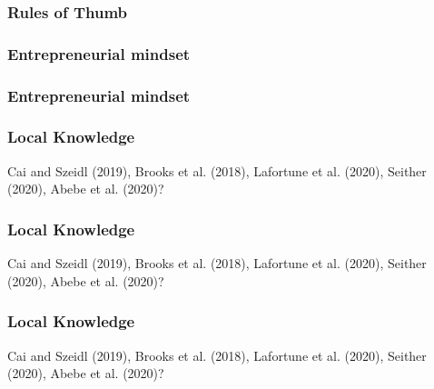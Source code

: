 \documentclass[hideothersubsections, usenames,dvipsnames,11pt]{beamer}
\newenvironment{itemize_2pt}{\itemize\addtolength{\itemsep}{2pt}}{\enditemize}
\begin{document}
\begin{frame}
\frametitle{Rules of Thumb}
	\begin{itemize_2pt}
	\item \citep{Arraiz2019} \citep{Cole2019}
	\vspace{0.1in}
	\end{itemize_2pt}
\end{frame}

%

\begin{frame}
\frametitle{Entrepreneurial mindset}
	\begin{itemize_2pt}
	\item \citep{Campos2017}
	\vspace{0.1in}
	\end{itemize_2pt}
\end{frame}

\begin{frame}
\frametitle{Entrepreneurial mindset}
	\begin{itemize_2pt}
	\item \citep{Alibhai2019} \citep{Ubfal2019}
	\vspace{0.1in}
	\end{itemize_2pt}
\end{frame}


\begin{frame}
\frametitle{Local Knowledge}
	\begin{itemize_2pt}
	\item Cai and Szeidl (2019), Brooks et al. (2018), Lafortune et al. (2020), Seither (2020), Abebe et al. (2020)?
	\vspace{0.1in}
	\end{itemize_2pt}
\end{frame}

\begin{frame}
\frametitle{Local Knowledge}
	\begin{itemize_2pt}
	\item Cai and Szeidl (2019), Brooks et al. (2018), Lafortune et al. (2020), Seither (2020), Abebe et al. (2020)?
	\vspace{0.1in}
	\end{itemize_2pt}
\end{frame}

\begin{frame}
\frametitle{Local Knowledge}
	\begin{itemize_2pt}
	\item Cai and Szeidl (2019), Brooks et al. (2018), Lafortune et al. (2020), Seither (2020), Abebe et al. (2020)?
	\vspace{0.1in}
	\end{itemize_2pt}
\end{frame}
\end{document}
